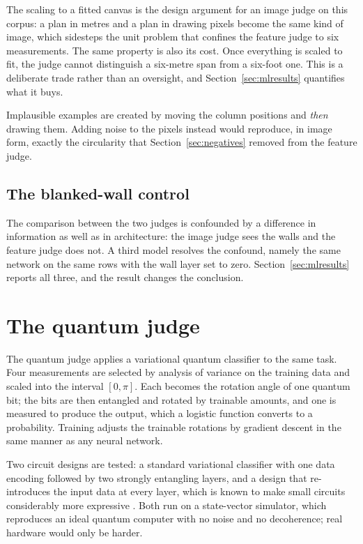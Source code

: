 The scaling to a fitted canvas is the design argument for an image judge on
this corpus: a plan in metres and a plan in drawing pixels become the same
kind of image, which sidesteps the unit problem that confines the feature
judge to six measurements. The same property is also its cost. Once
everything is scaled to fit, the judge cannot distinguish a six-metre span
from a six-foot one. This is a deliberate trade rather than an oversight,
and Section~\ref{sec:mlresults} quantifies what it buys.

Implausible examples are created by moving the column positions and
\emph{then} drawing them. Adding noise to the pixels instead would
reproduce, in image form, exactly the circularity that
Section~\ref{sec:negatives} removed from the feature judge.

\subsection{The blanked-wall control}

The comparison between the two judges is confounded by a difference in
information as well as in architecture: the image judge sees the walls and
the feature judge does not. A third model resolves the confound, namely the
same network on the same rows with the wall layer set to zero.
Section~\ref{sec:mlresults} reports all three, and the result changes the
conclusion.

\section{The quantum judge}
\label{sec:quantum}

The quantum judge applies a variational quantum classifier to the same
task. Four measurements are selected by analysis of variance on the
training data and scaled into the interval $[0, \pi]$. Each becomes the
rotation angle of one quantum bit; the bits are then entangled and rotated
by trainable amounts, and one is measured to produce the output, which a
logistic function converts to a probability. Training adjusts the
trainable rotations by gradient descent in the same manner as any neural
network.

Two circuit designs are tested: a standard variational classifier with one
data encoding followed by two strongly entangling layers, and a design that
re-introduces the input data at every layer, which is known to make small
circuits considerably more expressive
\citep{perezsalinas2020reupload}. Both run on a state-vector simulator,
which reproduces an ideal quantum computer with no noise and no
decoherence; real hardware would only be harder.

